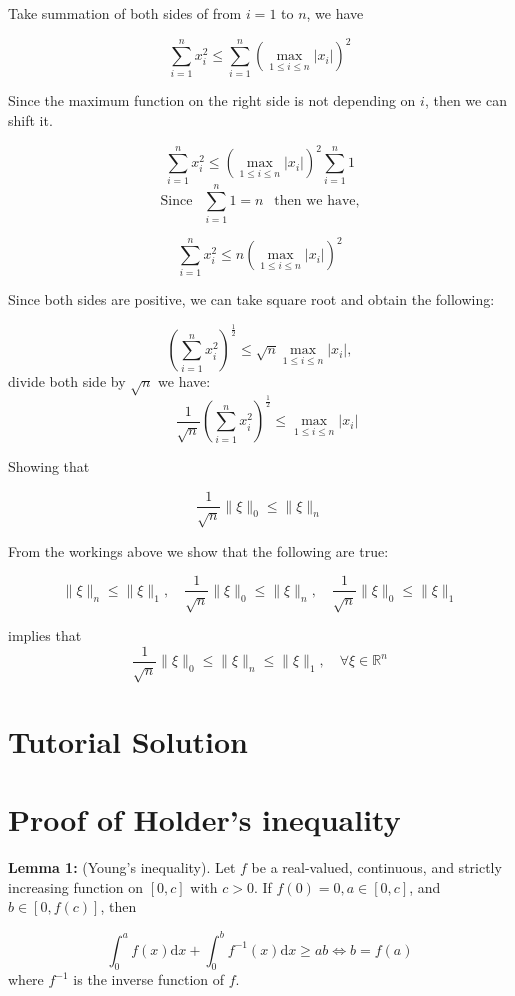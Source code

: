 \documentclass{article}
\begin{document}
Take summation of both sides of from $i=1$ to $n$, we have

$$
\sum_{i=1}^{n} x_{i}^{2} \leq \sum_{i=1}^{n}\left(\max _{1 \leq i \leq n}\left|x_{i}\right|\right)^{2}
$$

Since the maximum function on the right side  is not depending on $i$, then we can shift it.

$$
\sum_{i=1}^{n} x_{i}^{2} \leq\left(\max _{1 \leq i \leq n}\left|x_{i}\right|\right)^{2} \sum_{i=1}^{n} 1
$$
$$\text{Since } ~~\sum_{i=1}^{n} 1 =n ~~\text{ then we have,} $$ 

$$
\sum_{i=1}^{n} x_{i}^{2} \leq n\left(\max _{1 \leq i \leq n}\left|x_{i}\right|\right)^{2}
$$

Since both sides are positive, we can take square root and obtain the following:

$$
\left(\sum_{i=1}^{n} x_{i}^{2}\right)^{\frac{1}{2}} \leq \sqrt{n} \max _{1 \leq i \leq n}\left|x_{i}\right|, $$
divide both side by $\sqrt{n}$ we have:
$$\quad \frac{1}{\sqrt{n}}\left(\sum_{i=1}^{n} x_{i}^{2}\right)^{\frac{1}{2}} \leq \max _{1 \leq i \leq n}\left|x_{i}\right|
$$

Showing that

$$
\frac{1}{\sqrt{n}}\|\xi\|_{0} \leq\|\xi\|_{n}
$$

From the workings above we show that the following are true:

$$
\|\xi\|_{n} \leq\|\xi\|_{1}, \quad \frac{1}{\sqrt{n}}\|\xi\|_{0} \leq\|\xi\|_{n}, \quad \frac{1}{\sqrt{n}}\|\xi\|_{0} \leq\|\xi\|_{1}
$$

implies that
$$\frac{1}{\sqrt{n}}\|\xi\|_{0} \leq\|\xi\|_{n} \leq\|\xi\|_{1}, \quad \forall \xi \in \mathbb{R}^{n}$$

\section{Tutorial Solution}
\section{Proof of Holder's inequality}
\large
\textbf{Lemma 1:} (Young's inequality). Let $f$ be a real-valued, continuous, and strictly increasing function on $[0, c]$ with $c>0$. If $f(0)=0, a \in[0, c]$, and $b \in[0, f(c)]$, then

$$
\int_{0}^{a} f(x) \mathrm{d} x+\int_{0}^{b} f^{-1}(x) \mathrm{d} x \geq a b \iff b=f(a)
$$
where $f^{-1}$ is the inverse function of $f$.\\
\end{document}
